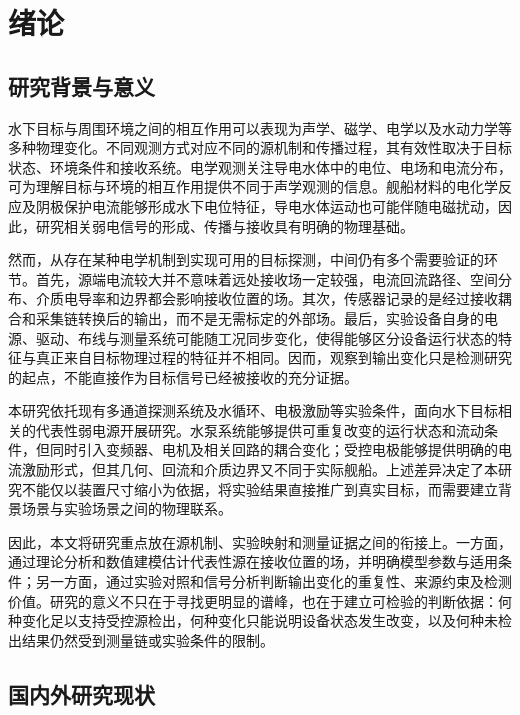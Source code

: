 \chapter{绪论}
\label{chap:introduction}

\section{研究背景与意义}

水下目标与周围环境之间的相互作用可以表现为声学、磁学、电学以及水动力学等多种物理变化。不同观测方式对应不同的源机制和传播过程，其有效性取决于目标状态、环境条件和接收系统。电学观测关注导电水体中的电位、电场和电流分布，可为理解目标与环境的相互作用提供不同于声学观测的信息。舰船材料的电化学反应及阴极保护电流能够形成水下电位特征，导电水体运动也可能伴随电磁扰动，因此，研究相关弱电信号的形成、传播与接收具有明确的物理基础\cite{woloszyn2022,chen2022}。

然而，从存在某种电学机制到实现可用的目标探测，中间仍有多个需要验证的环节。首先，源端电流较大并不意味着远处接收场一定较强，电流回流路径、空间分布、介质电导率和边界都会影响接收位置的场。其次，传感器记录的是经过接收耦合和采集链转换后的输出，而不是无需标定的外部场。最后，实验设备自身的电源、驱动、布线与测量系统可能随工况同步变化，使得能够区分设备运行状态的特征与真正来自目标物理过程的特征并不相同。因而，观察到输出变化只是检测研究的起点，不能直接作为目标信号已经被接收的充分证据。

本研究依托现有多通道探测系统及水循环、电极激励等实验条件，面向水下目标相关的代表性弱电源开展研究。水泵系统能够提供可重复改变的运行状态和流动条件，但同时引入变频器、电机及相关回路的耦合变化；受控电极能够提供明确的电流激励形式，但其几何、回流和介质边界又不同于实际舰船。上述差异决定了本研究不能仅以装置尺寸缩小为依据，将实验结果直接推广到真实目标，而需要建立背景场景与实验场景之间的物理联系。

因此，本文将研究重点放在源机制、实验映射和测量证据之间的衔接上。一方面，通过理论分析和数值建模估计代表性源在接收位置的场，并明确模型参数与适用条件；另一方面，通过实验对照和信号分析判断输出变化的重复性、来源约束及检测价值。研究的意义不只在于寻找更明显的谱峰，也在于建立可检验的判断依据：何种变化足以支持受控源检出，何种变化只能说明设备状态发生改变，以及何种未检出结果仍然受到测量链或实验条件的限制。

\section{国内外研究现状}

